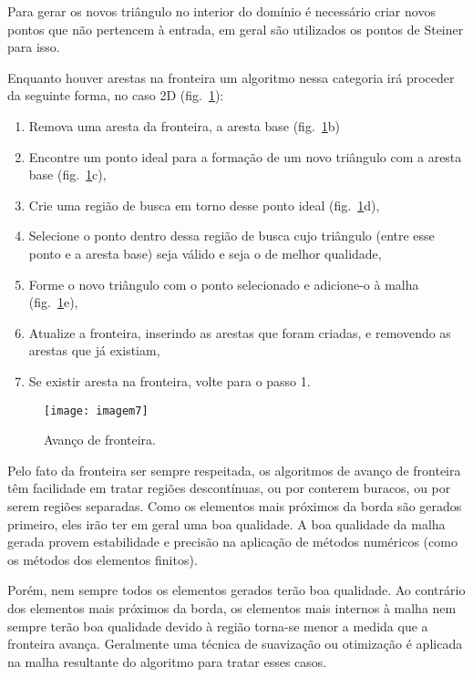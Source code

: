 Para gerar os novos triângulo no interior do domínio é necessário criar novos pontos que não pertencem à entrada, em geral são utilizados os pontos de Steiner para isso.

Enquanto houver arestas na fronteira um algoritmo nessa categoria irá proceder da seguinte forma, no caso 2D (fig.~\ref{fig:imagem7}):
 
 \begin{enumerate}
\item{ Remova uma aresta da fronteira, a aresta base (fig.~\ref{fig:imagem7}b)}
\item{ Encontre um ponto ideal para a formação de um novo triângulo com a aresta base (fig.~\ref{fig:imagem7}c),}
\item{ Crie uma região de busca em torno desse ponto ideal (fig.~\ref{fig:imagem7}d),}
\item{ Selecione o ponto dentro dessa região de busca cujo triângulo (entre esse ponto e a aresta base) seja válido e seja o de melhor qualidade,}
\item{ Forme o novo triângulo com o ponto selecionado e adicione-o à malha (fig.~\ref{fig:imagem7}e),}
\item{ Atualize a fronteira, inserindo as arestas que foram criadas, e removendo as arestas que já existiam,}
\item{ Se existir aresta na fronteira, volte para o passo 1.}
\end{enumerate}

 \begin{figure}[htbp]
     \centering
     \texttt{[image: imagem7]}
     \caption{Avanço de fronteira. \cite{bib:Freitas10}} 
     \label{fig:imagem7}
 \end{figure}

 Pelo fato da fronteira ser sempre respeitada, os algoritmos de avanço de fronteira têm facilidade em tratar regiões descontínuas, ou por conterem buracos, ou por serem regiões separadas. Como os elementos mais próximos da borda são gerados primeiro, eles irão ter em geral uma boa qualidade. A boa qualidade da malha gerada provem estabilidade e precisão na aplicação de métodos numéricos (como os métodos dos elementos finitos).

Porém, nem sempre todos os elementos gerados terão boa qualidade. Ao contrário dos elementos mais próximos da borda, os elementos mais internos à malha nem sempre terão boa qualidade devido à região torna-se menor a medida que a fronteira avança. Geralmente uma técnica de suavização ou otimização é aplicada na malha resultante do algoritmo para tratar esses casos.

